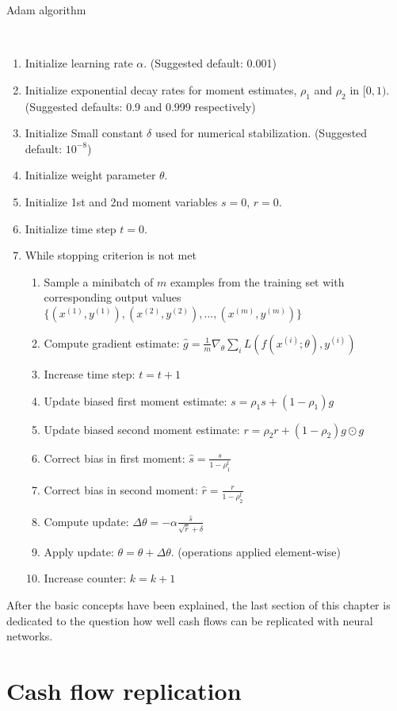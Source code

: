 \begin{algorithm}
	\caption{Adam algorithm \cite{goodfellow2016deep}}\label{alg:adam}
	\begin{algorithmic}
		\\
		\begin{enumerate}
			\item Initialize learning rate $\alpha$. (Suggested default: 0.001)
			\item Initialize exponential decay rates for moment estimates, $\rho_1$ and $\rho_2$ in $[0,1)$.
			(Suggested defaults: 0.9 and 0.999 respectively)		
			\item Initialize Small constant $\delta$ used for numerical stabilization. (Suggested default: $10^{-8}$)
			\item Initialize weight parameter $\theta$.
			\item Initialize 1st and 2nd moment variables $s = 0$, $r = 0$.
			\item Initialize time step $t = 0$.
			\item While stopping criterion is not met
			\begin{enumerate}[label=\emph{\alph*})]
				\item Sample a minibatch of $m$ examples from the training set with corresponding output values
				$\{(x^{(1)}, y^{(1)}), (x^{(2)}, y^{(2)}), ..., (x^{(m)}, y^{(m)})\}$
				\item Compute gradient estimate: $\hat{g} = \frac{1}{m} \nabla_\theta \sum_i L(f(x^{(i)};\theta), y^{(i)})$
				\item Increase time step: $t = t + 1$
				\item Update biased first moment estimate: $s = \rho_1 s + (1-\rho_1) g$
				\item Update biased second moment estimate: $r = \rho_2 r + (1-\rho_2) g \odot g$
				\item Correct bias in first moment: $\hat{s} = \frac{s}{1 - \rho_1^t}$
				\item Correct bias in second moment: $\hat{r} = \frac{r}{1 - \rho_2^t}$
				\item Compute update: $\Delta \theta = - \alpha \frac{\hat{s} }{\sqrt{\hat{r}} + \delta}$
				\item Apply update: $\theta = \theta + \Delta \theta$. (operations applied element-wise)
				\item Increase counter: $k = k + 1$
			\end{enumerate}
		\end{enumerate}
	\end{algorithmic}
\end{algorithm}




After the basic concepts have been explained, the last section of this chapter is dedicated to the question how well cash flows can be replicated with neural networks. 


\section{Cash flow replication}








